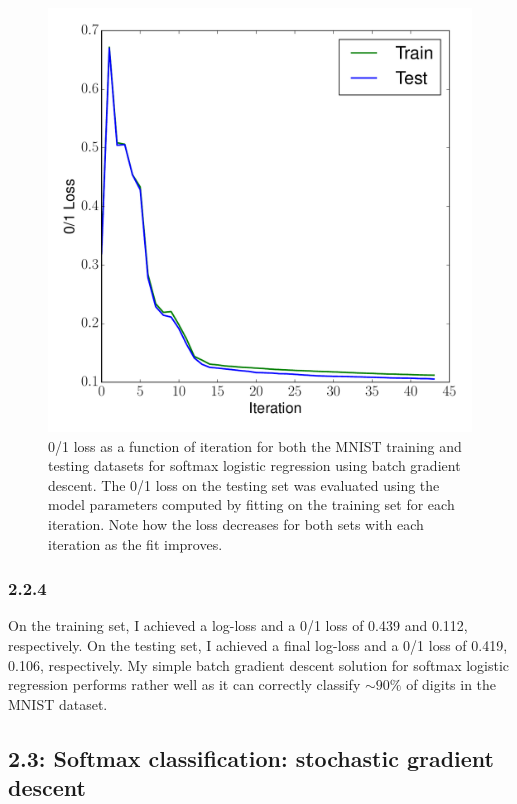 \documentclass[12pt]{amsart}
\begin{document}
\begin{figure}[H]
	\includegraphics[width=\columnwidth]{bgd_mnist_multi_train_test_01.pdf}
    \caption{0/1 loss as a function of iteration for both the MNIST training and testing datasets for softmax logistic regression using batch gradient descent.  The 0/1 loss on the testing set was evaluated using the model parameters computed by fitting on the training set for each iteration.  Note how the loss decreases for both sets with each iteration as the fit improves.}
    \label{fig:bgd_mnist_01}
\end{figure}

\subsubsection*{2.2.4}

On the training set, I achieved a log-loss and a 0/1 loss of 0.439 and 0.112, respectively.  On the testing set, I achieved a final log-loss and a 0/1 loss of 0.419, 0.106, respectively.  My simple batch gradient descent solution for softmax logistic regression performs rather well as it can correctly classify ${\sim}90\%$ of digits in the MNIST dataset.

\subsection*{2.3: Softmax classification: stochastic gradient descent}
\end{document}
